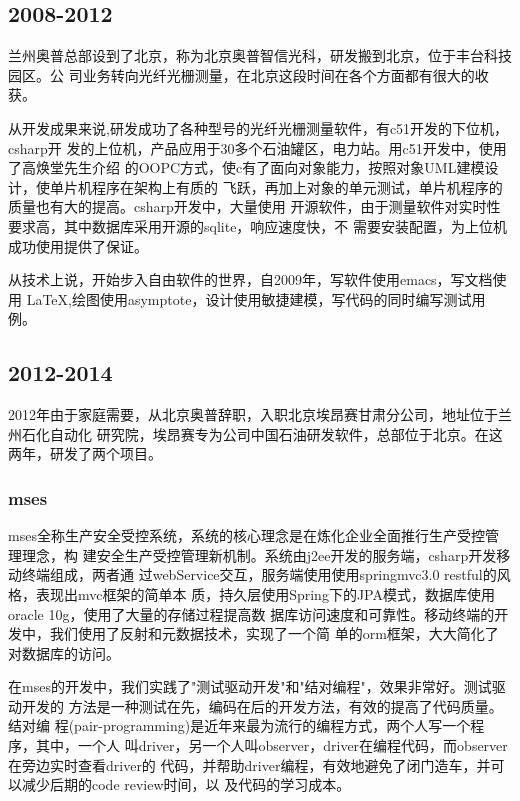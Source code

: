 \subsection{2008-2012}

兰州奥普总部设到了北京，称为北京奥普智信光科，研发搬到北京，位于丰台科技园区。公
司业务转向光纤光栅测量，在北京这段时间在各个方面都有很大的收获。

从开发成果来说,研发成功了各种型号的光纤光栅测量软件，有c51开发的下位机，csharp开
发的上位机，产品应用于30多个石油罐区，电力站。用c51开发中，使用了高焕堂先生介绍
的OOPC方式，使c有了面向对象能力，按照对象UML建模设计，使单片机程序在架构上有质的
飞跃，再加上对象的单元测试，单片机程序的质量也有大的提高。csharp开发中，大量使用
开源软件，由于测量软件对实时性要求高，其中数据库采用开源的sqlite，响应速度快，不
需要安装配置，为上位机成功使用提供了保证。

从技术上说，开始步入自由软件的世界，自2009年，写软件使用emacs，写文档使用
\LaTeX{},绘图使用asymptote，设计使用敏捷建模，写代码的同时编写测试用例。

\subsection{2012-2014}

2012年由于家庭需要，从北京奥普辞职，入职北京埃昂赛甘肃分公司，地址位于兰州石化自动化
研究院，埃昂赛专为公司中国石油研发软件，总部位于北京。在这两年，研发了两个项目。

\subsubsection{mses}

mses全称生产安全受控系统，系统的核心理念是在炼化企业全面推行生产受控管理理念，构
建安全生产受控管理新机制。系统由j2ee开发的服务端，csharp开发移动终端组成，两者通
过webService交互，服务端使用使用springmvc3.0 restful的风格，表现出mvc框架的简单本
质，持久层使用Spring下的JPA模式，数据库使用oracle 10g，使用了大量的存储过程提高数
据库访问速度和可靠性。移动终端的开发中，我们使用了反射和元数据技术，实现了一个简
单的orm框架，大大简化了对数据库的访问。

在mses的开发中，我们实践了"测试驱动开发"和"结对编程"，效果非常好。测试驱动开发的
方法是一种测试在先，编码在后的开发方法，有效的提高了代码质量。结对编
程(pair-programming)是近年来最为流行的编程方式，两个人写一个程序，其中，一个人
叫driver，另一个人叫observer，driver在编程代码，而observer在旁边实时查看driver的
代码，并帮助driver编程，有效地避免了闭门造车，并可以减少后期的code review时间，以
及代码的学习成本。

